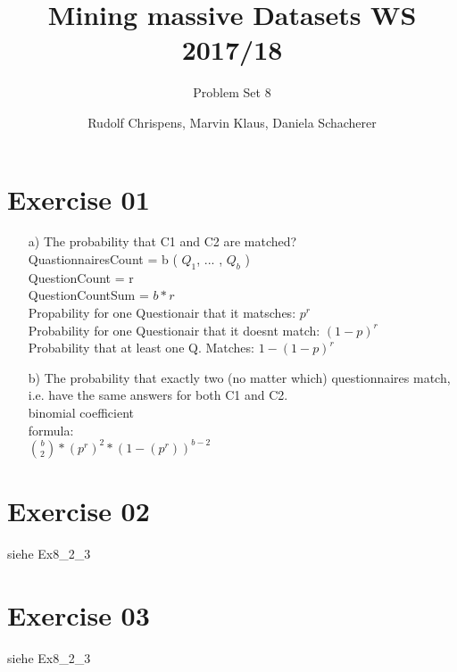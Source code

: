 \documentclass[11pt,a4paper]{scrartcl}
\title{Mining massive Datasets WS 2017/18}
\subtitle{Problem Set 8}
\author{Rudolf Chrispens, Marvin Klaus, Daniela Schacherer}
\begin{document}
\maketitle

\section*{Exercise 01}

\begin{itemize}
	\item[a)] The probability that C1 and C2 are matched?\\
	QuastionnairesCount = b ( $Q_1$, ... , $Q_b$ )\\
	QuestionCount = r \\
	QuestionCountSum = $b * r$\\
	Propability for one Questionair that it matsches: $p^r$\\
	Probability for one Questionair that it doesnt match: $(1-p)^r$\\ 
	Probability that at least one Q. Matches: $1-(1-p)^r$
	
	\item[b)] The probability that exactly two (no matter which) questionnaires match, i.e. have
the same answers for both C1 and C2.\\
	binomial coefficient\\
	formula: \\
	$\binom{b}{2} * (p^r)^2 * (1-(p^r))^{b-2}$

\end{itemize} 

\section*{Exercise 02}
siehe Ex8\_2\_3

\section*{Exercise 03}
siehe Ex8\_2\_3
\end{document}
